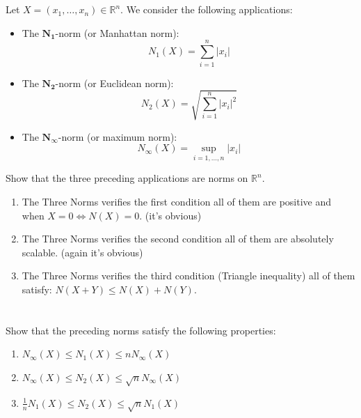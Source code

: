 \documentclass[12pt]{article}
\begin{document}
\newpage

\section{}
Let $X=(x_{1}, \ldots, x_{n}) \in \mathbb{R}^{n}$. We consider the following applications:
\begin{itemize}
    \item The $\mathbf{N_{1}}$-norm (or Manhattan norm):
    $$N_{1}(X) = \sum_{i=1}^{n} |x_{i}|$$
    \item The $\mathbf{N_{2}}$-norm (or Euclidean norm):
    $$N_{2}(X) = \sqrt{\sum_{i=1}^{n} |x_{i}|^{2}}$$
    \item The $\mathbf{N_{\infty}}$-norm (or maximum norm):
    $$N_{\infty}(X) = \sup_{i=1, \ldots, n} |x_{i}|$$
\end{itemize}
Show that the three preceding applications are norms on $\mathbb{R}^{n}$.


\begin{correctionbox}
    \begin{enumerate}
        \item The Three Norms verifies the first condition all of them are positive and when $X=0 \iff N(X) = 0$. (it's obvious)
        \item The Three Norms verifies the second condition all of them are absolutely scalable. (again it's obvious)
        \item The Three Norms verifies the third condition (Triangle inequality) all of them satisfy: $N(X+Y) \le N(X) + N(Y)$.  \end{enumerate}
\end{correctionbox}

\section{}
Show that the preceding norms satisfy the following properties:
\begin{enumerate}
    \item $N_{\infty}(X) \le N_{1}(X) \le n N_{\infty}(X)$
    \item $N_{\infty}(X) \le N_{2}(X) \le \sqrt{n} N_{\infty}(X)$
    \item $\frac{1}{n} N_{1}(X) \le N_{2}(X) \le \sqrt{n} N_{1}(X)$
\end{enumerate}
\end{document}
